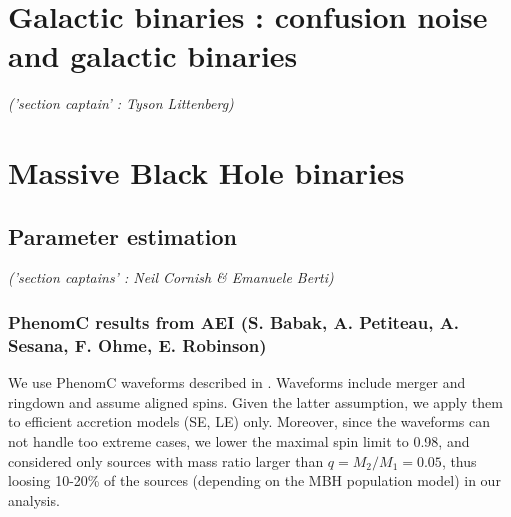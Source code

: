 \documentclass{iopart}
\begin{document}

\section{ Galactic binaries : confusion noise and galactic binaries}
\label{S:GalBin}
{ \it \small ('section captain' : Tyson Littenberg)}













\section{ Massive Black Hole binaries}
\label{S:MBHb}















\subsection{Parameter estimation}
\label{SS:MBHbPE}
{\it ('section captains' : Neil Cornish \& Emanuele Berti) }




\subsubsection{PhenomC results from AEI {(S. Babak, A. Petiteau, A. Sesana, F. Ohme, E. Robinson)}}
\label{SSS:MBHbPEPhenomAEI}
We use PhenomC waveforms described in \cite{sm10}. Waveforms include merger and ringdown and assume aligned spins. Given the latter assumption, we apply them to efficient accretion models (SE, LE) only. Moreover, since the waveforms can not handle too extreme cases, we lower the maximal spin limit to 0.98, and considered only sources with mass ratio larger than $q=M_2/M_1=0.05$, thus loosing 10-20\% of the sources (depending on the MBH population model) in our analysis.
\end{document}

